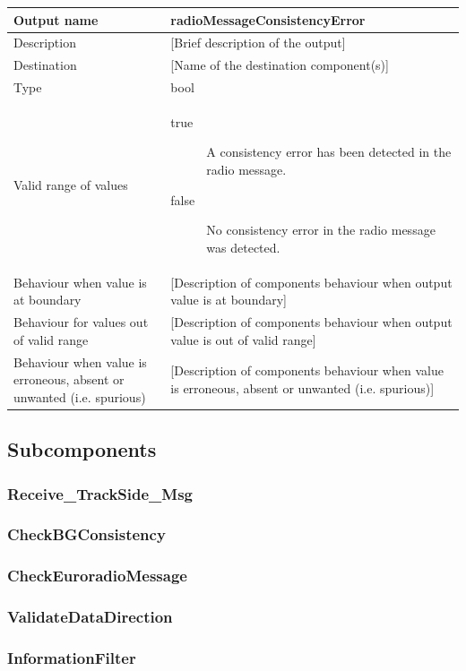\begin{longtable}{p{}p{}}
\toprule
Output name				& radioMessageConsistencyError \\
\midrule
Description				& [Brief description of the output] \\
\midrule
Destination				& [Name of the destination component(s)] \\ 
\midrule
Type					& bool \\
\midrule
Valid range of values	& \begin{description}
\item[true] A consistency error has been detected in the radio message.
\item[false] No consistency error in the radio message was detected.
\end{description} \\
\midrule
Behaviour when value is at boundary	& [Description of components behaviour when output value is at boundary] \\
\midrule
Behaviour for values out of valid range	& [Description of components behaviour when output value is out of valid range] \\
\midrule
Behaviour when value is erroneous, absent or unwanted (i.e. spurious) & [Description of components behaviour when value is erroneous, absent or unwanted (i.e. spurious)] \\
\bottomrule
\end{longtable}


\subsection{Subcomponents}\label{s:receivetrackdata_subcomponents}

\subsubsection{Receive\_TrackSide\_Msg}


\subsubsection{CheckBGConsistency}


\subsubsection{CheckEuroradioMessage}


\subsubsection{ValidateDataDirection}


\subsubsection{InformationFilter}


